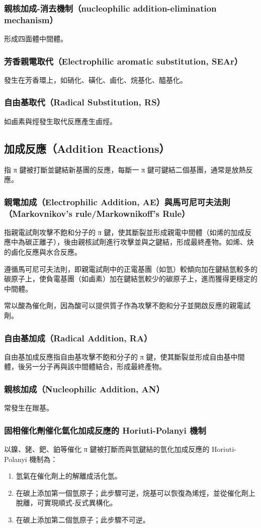\documentclass[a4paper,12pt]{report}
\begin{document}
\subsubsection{親核加成-消去機制（nucleophilic addition-elimination mechanism）}
形成四面體中間體。
\subsubsection{芳香親電取代（Electrophilic aromatic substitution, SEAr）}
發生在芳香環上，如硝化、磺化、鹵化、烷基化、醯基化。
\subsubsection{自由基取代（Radical Substitution, RS）}
如鹵素與烴發生取代反應產生鹵烴。
\subsection{加成反應（Addition Reactions）}
指 π 鍵被打斷並鍵結新基團的反應，每斷一 π 鍵可鍵結二個基團，通常是放熱反應。
\subsubsection{親電加成（Electrophilic Addition, AE）與馬可尼可夫法則（Markovnikov’s rule/Markownikoff's Rule）}
指親電試劑攻擊不飽和分子的 π 鍵，使其斷裂並形成親電中間體（如烯的加成反應中為碳正離子），後由親核試劑進行攻擊並與之鍵結，形成最終產物。如烯、炔的鹵化反應與水合反應。

遵循馬可尼可夫法則，即親電試劑中的正電基團（如氫）較傾向加在鍵結氫較多的碳原子上，使負電基團（如鹵素）加在鍵結氫較少的碳原子上，進而獲得更穩定的中間體。

常以酸為催化劑，因為酸可以提供質子作為攻擊不飽和分子並開啟反應的親電試劑。
\subsubsection{自由基加成（Radical Addition, RA）}
自由基加成反應指自由基攻擊不飽和分子的 π 鍵，使其斷裂並形成自由基中間體，後另一分子再與該中間體結合，形成最終產物。
\subsubsection{親核加成（Nucleophilic Addition, AN）}
常發生在羰基。
\subsubsection{固相催化劑催化氫化加成反應的 Horiuti-Polanyi 機制}
以鎳、銠、鈀、鉑等催化 π 鍵被打斷而與氫鍵結的氫化加成反應的 Horiuti-Polanyi 機制為：
\begin{enumerate}
\item 氫氣在催化劑上的解離成活化氫。
\item 在碳上添加第一個氫原子；此步驟可逆，烷基可以恢復為烯烴，並從催化劑上脫離，可實現順式-反式異構化。
\item 在碳上添加第二個氫原子；此步驟不可逆。
\end{enumerate}
\end{document}
